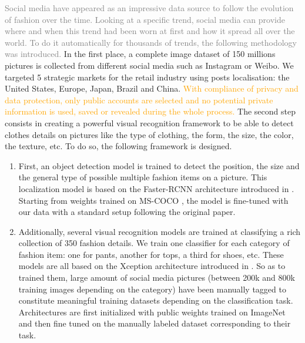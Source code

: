 \documentclass[10pt]{article} %
\begin{document}
\textcolor{gray}{Social media have appeared as an impressive data source to follow the evolution of fashion over the time. Looking at a specific trend, social media can provide where and when this trend had been worn at first and how it spread all over the world. To do it automatically for thousands of trends, the following methodology was introduced.} In the first place, a complete image dataset of 150 millions pictures is collected from different social media such as Instagram or Weibo. We targeted 5 strategic markets for the retail industry using posts localisation: the United States, Europe, Japan, Brazil and China. \textcolor{orange}{With compliance of privacy and data protection, only public accounts are selected and no potential private information is used, saved or revealed during the whole process.}
The second step consists in creating a powerful visual recognition framework to be able to detect clothes details on pictures like the type of clothing, the form, the size, the color, the texture, etc. To do so, the following framework is designed.
\begin{enumerate}
    \item First, an object detection model is trained to detect the position, the size and the general type of possible multiple fashion items on a picture. This localization model is based on the Faster-RCNN architecture introduced in \citet{ren2015}. Starting from weights trained on MS-COCO \citep{lin2014}, the model is fine-tuned with our data with a standard setup following the original paper.
    \item  Additionally, several visual recognition models are trained at classifying a rich collection of 350 fashion details. We train one classifier for each category of fashion item: one for pants, another for tops, a third for shoes, etc. These models are all based on the Xception architecture introduced in \citet{chollet2017}. So as to trained them, large amount of social media pictures (between 200k and 800k training images depending on the category) have been manually tagged to constitute meaningful training datasets depending on the classification task. Architectures are first initialized with public weights trained on ImageNet \citep{russakovsky2014} and then fine tuned on the manually labeled dataset corresponding to their task.
\end{enumerate}
\end{document}
